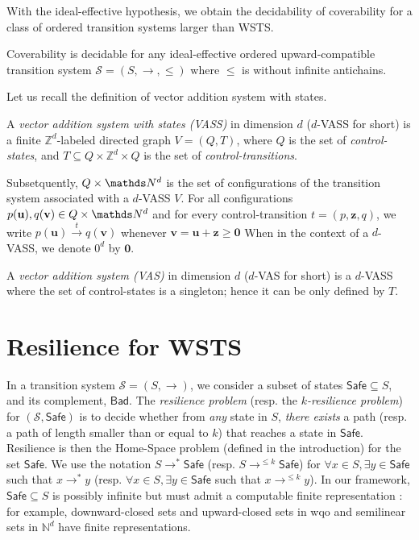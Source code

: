 \documentclass[runningheads]{llncs}
\newcommand{\Bad}{\textsf{Bad}}
\newcommand{\Safe}{\textsf{Safe}}
\begin{document}
With the ideal-effective hypothesis, we obtain the decidability of coverability for a class of ordered transition systems larger than WSTS.

\begin{theorem}\cite{BFM-ic17}
Coverability is decidable for any ideal-effective ordered upward-compatible transition system $\mathscr{S}=(S, \rightarrow, \leq)$ where $\leq$ is without infinite antichains.
\end{theorem}




Let us recall the  definition of vector addition system with states. 
 \begin{definition} 
A {\em vector addition system with states (VASS)} in dimension $d$ ($d$-VASS for short) is a finite $\mathds{Z}^d$-labeled directed graph $V = (Q,T)$, where $Q$ is the set of {\em control-states}, and $T \subseteq Q \times \mathds{Z}^d \times Q$ is the set of {\em control-transitions}. 
 \end{definition} 
%
Subsetquently, $Q \times \N^d$ is the set of configurations of the transition system associated with a $d$-VASS $V$.
For all configurations $p(\textbf{u}), q(\textbf{v}) \in Q \times \N^d$ and for every control-transition $t = (p, \textbf{z}, q)$, we write $p(\textbf{u}) \xrightarrow{t} q(\textbf{v})$ whenever $\textbf{v} = \textbf{u} + \textbf{z} \geq \textbf{0}$
%
When in the context of a $d$-VASS, we denote $0^d$ by $\textbf{0}$.

A {\em vector addition system (VAS)} in dimension $d$ ($d$-VAS for short) is a $d$-VASS where the set of control-states is a singleton; hence it can be only defined by $T$.





\section{Resilience for WSTS}



In a transition system $\mathscr{S}=(S,\rightarrow)$, we consider a subset of states $\Safe \subseteq S$, and its complement, $\Bad$.
The \emph{resilience problem} (resp. the \emph{$k$-resilience problem}) for $(\mathscr{S},\Safe)$ is to decide whether from \emph{any} state in 
$S$, \emph{there exists} a path (resp. a path of length smaller than or equal to $k$) that reaches a state in $\Safe$. Resilience is then the Home-Space problem (defined in the introduction) for the set $\Safe$. We use the notation 
$S \longrightarrow^{*} \Safe$ (resp. $S \longrightarrow^{\leq k} \Safe$)
 for 
$\forall x \in S, \exists y \in \Safe$ 
 such that $x \longrightarrow^{*} y$ 
  (resp.  $\forall x \in S, \exists y \in \Safe$ such that $x \longrightarrow^{\leq k} y$).
  In our framework, $\Safe \subseteq S$  is possibly infinite but  must admit a computable finite representation : for example, downward-closed sets and upward-closed sets in wqo and semilinear sets in $\mathbb{N}^d$ have finite representations. 
\end{document}
